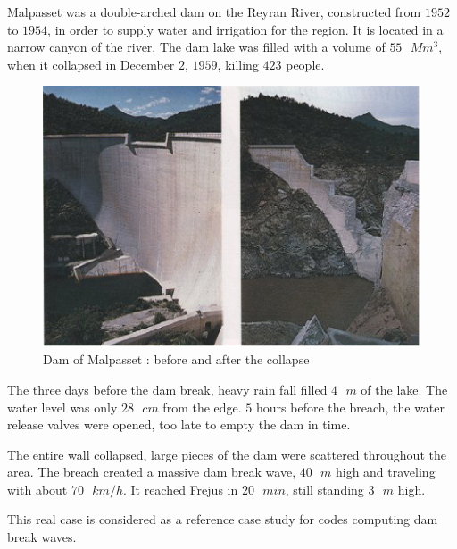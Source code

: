 \documentclass[a4paper,12pt]{article}
\begin{document}
\vspace{0.5cm}

Malpasset was a double-arched dam on the Reyran River, constructed
from $1952$ to $1954$, in order to supply water and irrigation for the
region. It is located in a narrow canyon of the river. The dam lake
was filled with a volume of $55\mbox{ }Mm^3$, when it collapsed in December $2$, $1959$, killing
$423$ people.

\newpage

\begin{figure}[h]
  \begin{center}
  \includegraphics[scale=0.7]{avant-apres}
  \caption{Dam of Malpasset : before and after the collapse}
  \end{center}
\end{figure}

The three days before the dam break, heavy rain fall filled $4\mbox{ }m$ of
the lake. The water level was only $28\mbox{ }cm$ from the edge. $5$ hours before
the breach, the water release valves were opened, too late to empty
the dam in time. 

\vspace{0.5cm}

The entire wall collapsed, large pieces of the dam were scattered throughout
the area. The breach created a massive dam break wave, $40\mbox{ }m$ high and
traveling with about $70\mbox{ }km/h$. It reached Frejus in $20\mbox{ }min$, still standing
$3\mbox{ }m$ high.

\vspace{0.5cm}

This real case is considered as a reference case study for codes computing
dam break waves.
\end{document}
